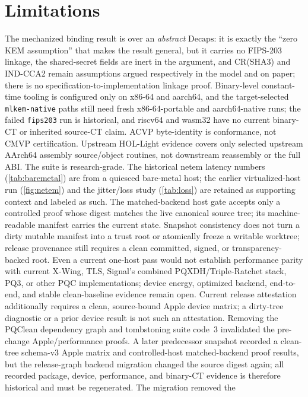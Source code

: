 \documentclass[journal]{IEEEtran}
\newcommand{\code}[1]{\texttt{\small #1}}
\begin{document}
\section{Limitations}\label{sec:limits}
The mechanized binding result is over an \emph{abstract} $\mathrm{Decaps}$: it is exactly the
``zero KEM assumption'' that makes the result general, but it carries no FIPS-203 linkage, the
shared-secret fields are inert in the argument, and CR(SHA3) and IND-CCA2 remain assumptions argued
respectively in the model and on paper; there is no specification-to-implementation linkage proof.
Binary-level constant-time tooling is configured only on x86-64 and aarch64, and the
target-selected \code{mlkem-native} paths still need fresh x86-64-portable and
aarch64-native runs; the failed \code{fips203}
run is historical, and riscv64 and wasm32 have no current binary-CT
or inherited source-CT claim. ACVP byte-identity is conformance, not CMVP
certification. Upstream HOL-Light evidence covers only selected upstream AArch64
assembly source/object routines, not downstream reassembly or the full ABI. The suite
is research-grade. The historical netem latency numbers (\cref{tab:baremetal}) are from a quiesced bare-metal host; the
earlier virtualized-host run (\cref{fig:netem}) and the jitter/loss study (\cref{tab:loss}) are
retained as supporting context and labeled as such. The matched-backend host gate accepts only a
controlled proof whose digest matches the live canonical source tree; its machine-readable manifest
carries the current state. Snapshot consistency does not turn a dirty mutable manifest into a trust
root or atomically freeze a writable worktree; release provenance still requires a clean committed,
signed, or transparency-backed root. Even a current one-host pass would not establish performance parity with current X-Wing, TLS, Signal's
combined PQXDH/Triple-Ratchet stack, PQ3, or other PQC implementations; device energy, optimized backend, end-to-end, and
stable clean-baseline evidence remain open. Current release attestation additionally requires a
clean, source-bound Apple device matrix; a dirty-tree diagnostic or a prior device result is not such
an attestation. Removing the PQClean dependency graph and tombstoning suite code~3 invalidated the
pre-change Apple/performance proofs. A later predecessor snapshot recorded a clean-tree schema-v3
Apple matrix and controlled-host matched-backend proof results, but the release-graph backend migration
changed the source digest again; all recorded package, device, performance, and binary-CT evidence
is therefore historical and must be regenerated. The migration removed the
\end{document}
